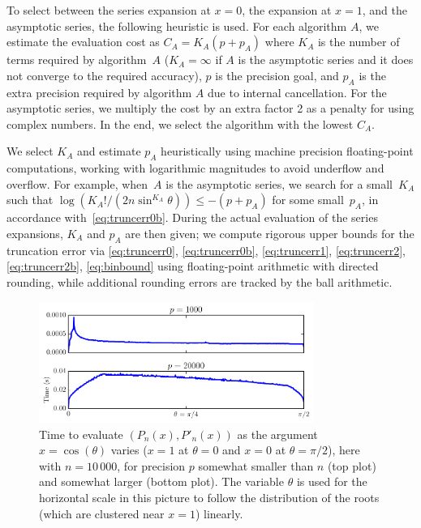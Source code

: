 \documentclass[nohypdvips,review]{siamart0216}
\begin{document}
To select between the series expansion at $x = 0$, the expansion at $x = 1$, and the asymptotic series, the following heuristic is used. For each algorithm $A$, we estimate the evaluation cost as $C_A = K_A (p + p_A)$ where $K_A$ is the number of terms required by algorithm~$A$ ($K_A = \infty$ if $A$ is the asymptotic series and it does not converge to the required accuracy), $p$ is the precision goal, and $p_A$ is the extra precision required by algorithm $A$ due to internal cancellation. For the asymptotic series, we multiply the cost by an extra factor 2 as a penalty for using complex numbers. In the end, we select the algorithm with the lowest $C_A$.

We select $K_A$ and estimate $p_A$ heuristically using machine precision
floating-point computations, working with logarithmic magnitudes to
avoid underflow and overflow.
For example, when~$A$ is the asymptotic series, we search for a
small~$K_A$ such that $\log(K_A!/(2n\sin^{K_A}\theta)) \leq -(p + p_A)$
for some small~$p_A$, in accordance with~\eqref{eq:truncerr0b}.
During the actual evaluation of the series expansions, $K_A$ and $p_A$ are then given;
we compute rigorous upper bounds
for the truncation error via
\cref{eq:truncerr0}, \cref{eq:truncerr0b}, \cref{eq:truncerr1},
\cref{eq:truncerr2}, \cref{eq:truncerr2b}, \cref{eq:binbound}
using floating-point arithmetic with directed rounding,
while additional rounding errors are tracked by the ball arithmetic.

\begin{figure}
\begin{centering}
\includegraphics[width=0.8\textwidth]{timeplot}
\caption{Time to evaluate $(P_n(x), P'_n(x))$ as the argument $x = \cos(\theta)$ varies ($x = 1$ at $\theta = 0$ and $x = 0$ at $\theta = \pi/2$), here with $n = 10\,000$, for
precision $p$ somewhat smaller than $n$ (top plot) and somewhat larger (bottom plot). The variable $\theta$ is used for the horizontal scale in this picture
to follow the distribution of the roots (which are clustered near $x = 1$) linearly.}
\label{fig:timeplot}
\end{centering}
\end{figure}
\end{document}
